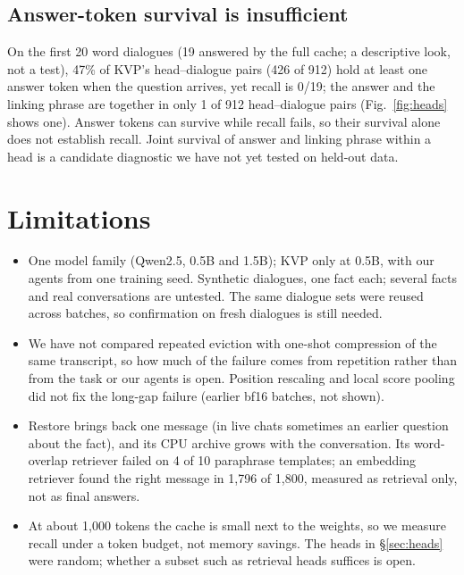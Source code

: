 \documentclass[11pt,a4paper]{article}
\begin{document}
\subsection{Answer-token survival is insufficient}\label{sec:survival}
On the first 20 word dialogues (19 answered by the full cache; a descriptive look, not a test), 47\% of KVP's head--dialogue pairs (426 of 912) hold at least one answer token when the question arrives, yet recall is 0/19; the answer and the linking phrase are together in only 1 of 912 head--dialogue pairs (Fig.~\ref{fig:heads} shows one). Answer tokens can survive while recall fails, so their survival alone does not establish recall. Joint survival of answer and linking phrase within a head is a candidate diagnostic we have not yet tested on held-out data.


\section{Limitations}
\begin{itemize}
  \item One model family (Qwen2.5, 0.5B and 1.5B); KVP only at 0.5B, with our agents from one training seed. Synthetic dialogues, one fact each; several facts and real conversations are untested. The same dialogue sets were reused across batches, so confirmation on fresh dialogues is still needed.
  \item We have not compared repeated eviction with one-shot compression of the same transcript, so how much of the failure comes from repetition rather than from the task or our agents is open. Position rescaling and local score pooling did not fix the long-gap failure (earlier bf16 batches, not shown).
  \item Restore brings back one message (in live chats sometimes an earlier question about the fact), and its CPU archive grows with the conversation. Its word-overlap retriever failed on 4 of 10 paraphrase templates; an embedding retriever found the right message in 1,796 of 1,800, measured as retrieval only, not as final answers.
  \item At about 1,000 tokens the cache is small next to the weights, so we measure recall under a token budget, not memory savings. The heads in \S\ref{sec:heads} were random; whether a subset such as retrieval heads \cite{retrievalheads} suffices is open.
\end{itemize}
\end{document}
